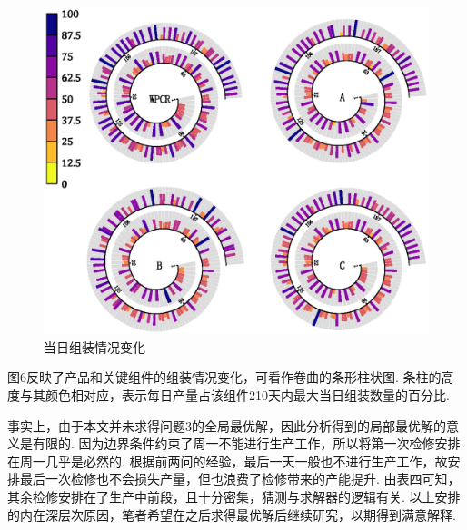 \begin{figure}[!htbp]
	\centering
	\includegraphics[width=16cm]{Image/问题三展示.eps}
	\caption{当日组装情况变化}\label{当日组装情况变化}
\end{figure}

图6反映了产品和关键组件的组装情况变化，可看作卷曲的条形柱状图.
条柱的高度与其颜色相对应，表示每日产量占该组件210天内最大当日组装数量的百分比.

\begin{table}[!htbp]
\centering
\caption{问题3的结果（检修日期及总成本）}
\end{table}

事实上，由于本文并未求得问题3的全局最优解，因此分析得到的局部最优解的意义是有限的.
因为边界条件约束了周一不能进行生产工作，所以将第一次检修安排在周一几乎是必然的.
根据前两问的经验，最后一天一般也不进行生产工作，故安排最后一次检修也不会损失产量，但也浪费了检修带来的产能提升.
由表四可知，其余检修安排在了生产中前段，且十分密集，猜测与求解器的逻辑有关.
以上安排的内在深层次原因，笔者希望在之后求得最优解后继续研究，以期得到满意解释.

